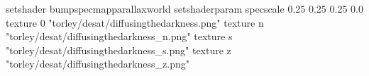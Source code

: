 setshader bumpspecmapparallaxworld
setshaderparam specscale 0.25 0.25 0.25 0.0
texture 0 "torley/desat/diffusingthedarkness.png"
texture n "torley/desat/diffusingthedarkness_n.png"
texture s "torley/desat/diffusingthedarkness_s.png"
texture z "torley/desat/diffusingthedarkness_z.png"

